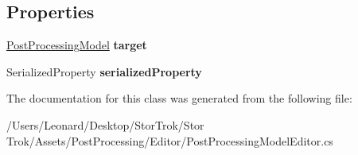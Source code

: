 \subsection*{Properties}
\begin{DoxyCompactItemize}
\item 
\mbox{\label{class_unity_editor_1_1_post_processing_1_1_post_processing_model_editor_a53c7a213e12f6be0712a6cb752bf61ec}} 
\hyperlink{class_unity_engine_1_1_post_processing_1_1_post_processing_model}{Post\+Processing\+Model} {\bfseries target}
\item 
\mbox{\label{class_unity_editor_1_1_post_processing_1_1_post_processing_model_editor_a64e8869152a0ca85df60e69ba1033e16}} 
Serialized\+Property {\bfseries serialized\+Property}
\end{DoxyCompactItemize}


The documentation for this class was generated from the following file\+:\begin{DoxyCompactItemize}
\item 
/\+Users/\+Leonard/\+Desktop/\+Stor\+Trok/\+Stor Trok/\+Assets/\+Post\+Processing/\+Editor/Post\+Processing\+Model\+Editor.\+cs\end{DoxyCompactItemize}
